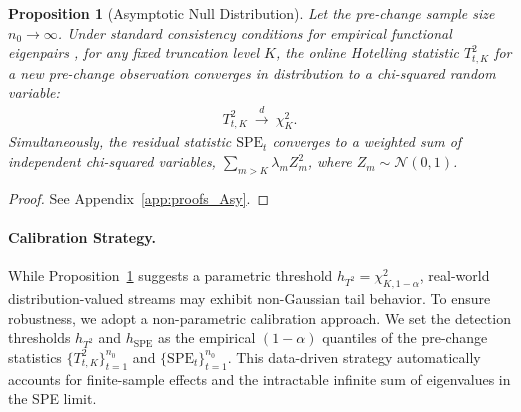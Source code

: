 \documentclass{article}
\theoremstyle{plain}
\newtheorem{proposition}[theorem]{Proposition}
\theoremstyle{definition}
\theoremstyle{remark}
\begin{document}
\begin{proposition}[Asymptotic Null Distribution]\label{prop:asymptotic_null}
Let the pre-change sample size $n_0 \to \infty$. 
Under standard consistency conditions for empirical functional eigenpairs \citep{hall2006properties}, for any fixed truncation level $K$, the online Hotelling statistic $T_{t,K}^2$ for a new pre-change observation converges in distribution to a chi-squared random variable:
\begin{align}\label{eq:chi_sq_limit}
T_{t,K}^2 \ \xrightarrow{d} \ \chi^2_K.
\end{align}
Simultaneously, the residual statistic $\mathrm{SPE}_t$ converges to a weighted sum of independent chi-squared variables, $\sum_{m>K} \lambda_m Z_m^2$, where $Z_m \sim \mathcal{N}(0,1)$.
\end{proposition}

\begin{proof}See Appendix~\ref{app:proofs_Asy}.
\end{proof}


\paragraph{Calibration Strategy.}
While Proposition~\ref{prop:asymptotic_null} suggests a parametric threshold $h_{T^2} = \chi^2_{K, 1-\alpha}$, real-world distribution-valued streams may exhibit non-Gaussian tail behavior. 
To ensure robustness, we adopt a non-parametric calibration approach. We set the detection thresholds $h_{T^2}$ and $h_{\mathrm{SPE}}$ as the empirical $(1-\alpha)$ quantiles of the pre-change statistics $\{T_{t,K}^2\}_{t=1}^{n_0}$ and $\{\mathrm{SPE}_t\}_{t=1}^{n_0}$. 
This data-driven strategy automatically accounts for finite-sample effects and the intractable infinite sum of eigenvalues in the SPE limit.
\end{document}

